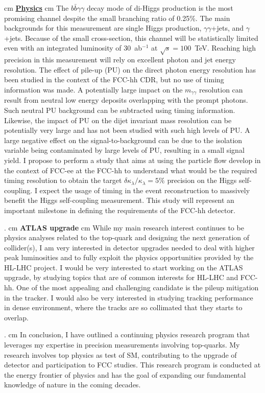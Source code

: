 \documentclass[12pt]{article}
\begin{document}
 cm
\noindent
\underline{\bf Physics}
 cm
\noindent
The $b\bar{b}\gamma\gamma$ decay mode of di-Higgs production is the most promising channel despite the small branching ratio of 0.25\%. The main backgrounds for this measurement are single Higgs production, $\gamma\gamma$+jets, and $\gamma$+jets. Because of the small cross-section, this channel will be statistically limited even with an integrated luminosity of 30~ab$^{-1}$ at $\sqrt{s}=100$~TeV.  Reaching high precision in this measurement will rely on excellent photon and jet energy resolution. The effect of pile-up (PU) on the direct photon energy resolution has been studied in the context of the FCC-hh CDR, but no use of timing information was made. A potentially large impact on the $m_{\gamma\gamma}$ resolution can result from neutral low energy deposits overlapping with the prompt photons. Such neutral PU background can be subtracted using timing information. Likewise, the impact of PU on the dijet invariant mass resolution can be potentially very large and has not been studied with such high levels of PU. A large negative effect on the signal-to-background can be due to the isolation variable being contaminated by large levels of PU, resulting in a small signal yield. I propose to perform a study that aims at using the particle flow develop in the context of FCC-ee at the FCC-hh to understand what would be the required timing resolution to obtain the target  $\delta\kappa_\lambda/\kappa_\lambda = 5\%$ precision on the Higgs self-coupling. I expect the usage of timing in the event reconstruction to massively benefit the Higgs self-coupling measurement. This study will represent an important milestone in defining the requirements of the FCC-hh detector. 



. cm
\noindent
{\bf \Large ATLAS upgrade}
 cm
\noindent
While my main research interest continues to be physics analyses related to the top-quark and designing the next generation of collider(s), I am very interested in detector upgrades needed to deal with higher peak luminosities and to fully exploit the physics opportunities provided by the HL-LHC project. I would be very interested to start working on the ATLAS upgrade, by studying topics that are of common interests for HL-LHC and FCC-hh. One of the most appealing and challenging candidate is the pileup mitigation in the tracker. I would also be very interested in studying tracking performance in dense environment, where the tracks are so collimated that they starts to overlap.


. cm
\noindent
In conclusion, I have outlined a continuing physics research program that leverages my expertise in precision measurements involving top-quarks. My research involves top physics as test of SM, contributing to the upgrade of detector and participation to FCC studies. This research program is conducted at the energy frontier of physics and has the goal of expanding our fundamental knowledge of nature in the coming decades.
\end{document}
